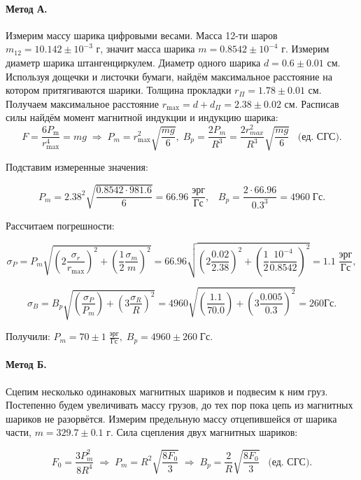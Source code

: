 \documentclass[a4paper,12pt]{article} %
\begin{document}
\paragraph{Метод А.} Измерим массу шарика цифровыми весами. Масса 12-ти шаров $m_{12} = 10.142 \pm 10^{-3}$ г, значит масса шарика $m = 0.8542 \pm 10^{-4}$ г. Измерим диаметр шарика штангенциркулем. Диаметр одного шарика $d = 0.6 \pm 0.01$ см. Используя дощечки и листочки бумаги, найдём максимальное расстояние на котором притягиваются шарики. Толщина прокладки $r_{\Pi} = 1.78 \pm 0.01$ см. Получаем максимальное расстояние $r_{\max} = d + d_{\Pi} = 2.38 \pm 0.02$ см. Расписав силы найдём момент магнитной индукции и индукцию шарика:
\[ F  = \frac{6 P_{\text{m}}}{r_{\max}^4} = mg \; \Rightarrow \; P_{m} = r_{\max}^2 \sqrt{\frac{mg}{6}}, \; 
B_{p} = \frac{2 P_{m}}{R^3} = \frac{2 r_{max}^2}{R^3}\sqrt{\frac{mg}{6}} \;\;\; \text{(ед. СГС)}.
\]

Подставим измеренные значения:

\[ P_m = 2.38^2 \sqrt{\frac{0.8542 \cdot 981.6}{6}} = 66.96 \; \frac{\text{эрг}}{\text{Гс}}, \;\;\; B_p = \frac{2 \cdot 66.96}{0.3^3} = 4960 \; \text{Гс}.
\]

Рассчитаем погрешности:

\[\sigma_P = P_m \sqrt{\left( 2 \frac{\sigma_r}{r_{\max}} \right)^2 + \left( \frac{1}{2} \frac{\sigma_m}{m} \right)^2} = 66.96 \sqrt{\left( 2 \frac{0.02}{2.38} \right)^2 + \left( \frac{1}{2} \frac{10^{-4}}{0.8542} \right)^2} = 1.1 \; \frac{\text{эрг}}{\text{Гс}},
\]

\[\sigma_B = B_p \sqrt{\left( \frac{\sigma_P}{P_m} \right)  + \left( 3 \frac{\sigma_R}{R} \right)^2} = 4960 \sqrt{\left( \frac{1.1}{70.0} \right)  + \left( 3 \frac{0.005}{0.3} \right)^2} = 260 \text{Гс}.
\]

Получили: $P_m = 70 \pm 1 \; \frac{\text{эрг}}{\text{Гс}}, \; B_p = 4960 \pm 260 \; \text{Гс}$.

\paragraph{Метод Б.} Сцепим несколько одинаковых магнитных шариков и подвесим к ним груз. Постепенно будем увеличивать массу грузов, до тех пор пока цепь из магнитных шариков не разорвётся. Измерим предельную массу отцепившейся от шарика части, $m = 329.7 \pm 0.1$ г. Сила сцепления двух магнитных шариков:

\[ F_0 = \frac{3 P_m^2}{8 R^4} \; \Rightarrow \; P_m = R^2 \sqrt{\frac{8F_0}{3}} \; \Rightarrow \; B_p = \frac{2}{R}\sqrt{\frac{8F_0}{3}} \;\;\; \text{(ед. СГС)}.
\]
\end{document}
